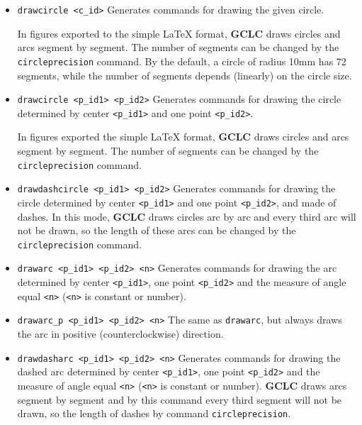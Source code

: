 \documentclass[a4paper]{book}
\newcommand{\gclc}{{\bfseries GCLC}\xspace}
\begin{document}
\begin{itemize}
\item \verb|drawcircle <c_id>|
        Generates commands for drawing the given circle.

        In figures exported to the simple \LaTeX{} format, \gclc draws
        circles and arcs segment by segment. The number of segments can
        be changed by the \verb|circleprecision| command. By the default,
        a circle of radius 10mm has 72 segments, while the number of
        segments depends (linearly) on the circle size.

\item \verb|drawcircle <p_id1> <p_id2>|
        Generates commands for drawing the circle determined
        by center \verb|<p_id1>| and one point \verb|<p_id2>|.

        In figures exported the simple \LaTeX{} format,
        \gclc draws circles and arcs segment by segment. The number of
        segments can be changed by the \verb|circleprecision| command.

\item \verb|drawdashcircle <p_id1> <p_id2>|
        Generates commands for drawing the circle determined
        by center \verb|<p_id1>| and one point  \verb|<p_id2>|,
        and made of dashes. In this mode, \gclc draws circles arc
        by arc and every third arc will not be drawn, so the length
        of these arcs can be changed by the \verb|circleprecision| command.

\item \verb|drawarc <p_id1> <p_id2> <n>|
        Generates commands for drawing the arc determined
        by center \verb|<p_id1>|, one point \verb|<p_id2>| and the measure
        of angle equal \verb|<n>| (\verb|<n>| is constant or {\sc number}).

\item \verb|drawarc_p <p_id1> <p_id2> <n>|
        The same as \verb|drawarc|, but always draws the arc in positive
        (counterclockwise) direction.

\item \verb|drawdasharc <p_id1> <p_id2> <n>|
        Generates commands for drawing the dashed arc determined
        by center \verb|<p_id1>|, one point \verb|<p_id2>|
        and the measure of angle equal \verb|<n>| (\verb|<n>| is
        constant or {\sc number}). \gclc draws arcs
        segment by segment and by this command every third segment will
        not be drawn, so the length of dashes by command \verb|circleprecision|.


\end{itemize}
\end{document}
